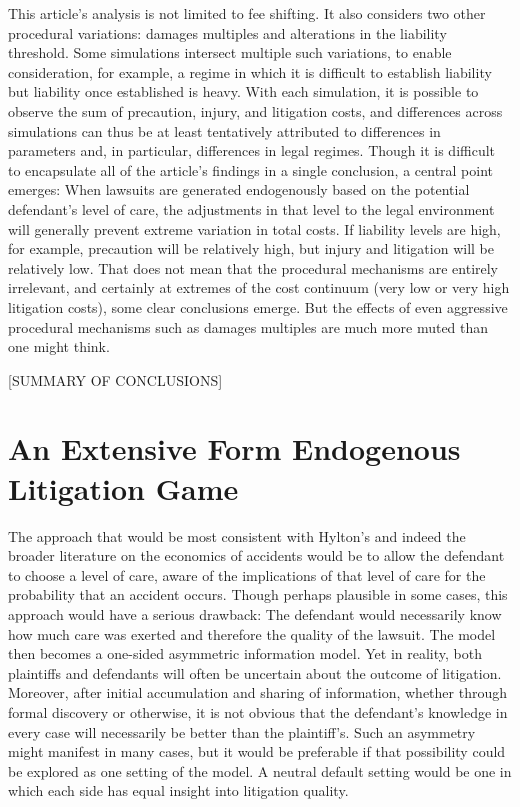 \documentclass{article}
\begin{document}
This article's analysis is not limited to fee shifting. It also considers two other procedural variations: damages multiples and alterations in the liability threshold. Some simulations intersect multiple such variations, to enable consideration, for example, a regime in which it is difficult to establish liability but liability once established is heavy. With each simulation, it is possible to observe the sum of precaution, injury, and litigation costs, and differences across simulations can thus be at least tentatively attributed to differences in parameters and, in particular, differences in legal regimes. Though it is difficult to encapsulate all of the article's findings in a single conclusion, a central point emerges: When lawsuits are generated endogenously based on the potential defendant's level of care, the adjustments in that level to the legal environment will generally prevent extreme variation in total costs. If liability levels are high, for example, precaution will be relatively high, but injury and litigation will be relatively low. That does not mean that the procedural mechanisms are entirely irrelevant, and certainly at extremes of the cost continuum (very low or very high litigation costs), some clear conclusions emerge. But the effects of even aggressive procedural mechanisms such as damages multiples are much more muted than one might think. 

[SUMMARY OF CONCLUSIONS]

\section{An Extensive Form Endogenous Litigation Game}

The approach that would be most consistent with Hylton's and indeed the broader literature on the economics of accidents would be to allow the defendant to choose a level of care, aware of the implications of that level of care for the probability that an accident occurs. Though perhaps plausible in some cases, this approach would have a serious drawback: The defendant would necessarily know how much care was exerted and therefore the quality of the lawsuit. The model then becomes a one-sided asymmetric information model. Yet in reality, both plaintiffs and defendants will often be uncertain about the outcome of litigation. Moreover, after initial accumulation and sharing of information, whether through formal discovery or otherwise, it is not obvious that the defendant's knowledge in every case will necessarily be better than the plaintiff's. Such an asymmetry might manifest in many cases, but it would be preferable if that possibility could be explored as one setting of the model. A neutral default setting would be one in which each side has equal insight into litigation quality. 
\end{document}

